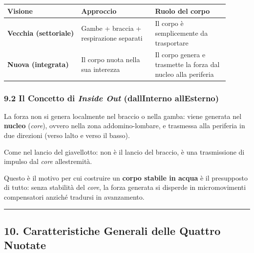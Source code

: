 \documentclass[a4paper,11pt]{article}
\begin{document}
\begin{longtable}[]{@{}p{0.30\linewidth}p{0.30\linewidth}p{0.30\linewidth}@{}}
      \toprule\noalign{}
      Visione                       & Approccio                               & Ruolo del corpo \\
      \midrule\noalign{}
      \endhead
      \bottomrule\noalign{}
      \endlastfoot
      \textbf{Vecchia (settoriale)} & Gambe + braccia + respirazione separati
                                    & Il corpo è semplicemente da trasportare                   \\
      \textbf{Nuova (integrata)}    & Il corpo nuota nella sua interezza      & Il
      corpo genera e trasmette la forza dal nucleo alla periferia                               \\
\end{longtable}

\subsubsection{\texorpdfstring{9.2 Il Concetto di \emph{Inside Out}
            (dall\textquotesingle Interno
            all\textquotesingle Esterno)}{9.2 Il Concetto di Inside Out (dall\textquotesingle Interno all\textquotesingle Esterno)}}\label{il-concetto-di-inside-out-dallinterno-allesterno}

La forza non si genera localmente nel braccio o nella gamba: viene
generata nel \textbf{nucleo} (\emph{core}), ovvero nella zona
addomino-lombare, e trasmessa alla periferia in due direzioni (verso
l\textquotesingle alto e verso il basso).

Come nel lancio del giavellotto: non è il lancio del braccio, è una
trasmissione di impulso dal \emph{core} all\textquotesingle estremità.

Questo è il motivo per cui costruire un \textbf{corpo stabile in acqua}
è il presupposto di tutto: senza stabilità del \emph{core}, la forza
generata si disperde in micromovimenti compensatori anziché tradursi in
avanzamento.

\begin{center}\rule{0.5\linewidth}{0.5pt}\end{center}

\subsection{10. Caratteristiche Generali delle Quattro
      Nuotate}\label{caratteristiche-generali-delle-quattro-nuotate}
\end{document}
